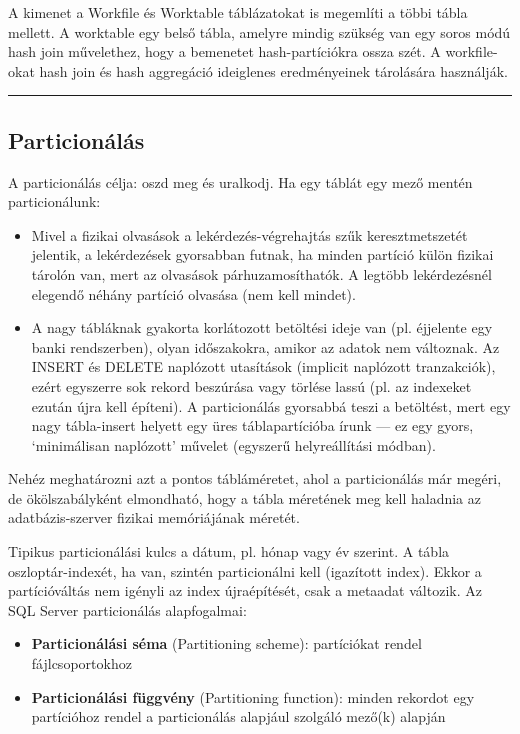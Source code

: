\documentclass[
  magyar,
]{article}
\providecommand{\tightlist}{%
  \setlength{\itemsep}{0pt}\setlength{\parskip}{0pt}}
\begin{document}
A kimenet a Workfile és Worktable táblázatokat is megemlíti a többi
tábla mellett. A worktable egy belső tábla, amelyre mindig szükség van
egy soros módú hash join művelethez, hogy a bemenetet hash-partíciókra
ossza szét. A workfile-okat hash join és hash aggregáció ideiglenes
eredményeinek tárolására használják.

\begin{center}\rule{0.5\linewidth}{0.5pt}\end{center}

\subsection{Particionálás}\label{particionuxe1luxe1s}

A particionálás célja: oszd meg és uralkodj. Ha egy táblát egy mező
mentén particionálunk:

\begin{itemize}
\tightlist
\item
  Mivel a fizikai olvasások a lekérdezés-végrehajtás szűk
  keresztmetszetét jelentik, a lekérdezések gyorsabban futnak, ha minden
  partíció külön fizikai tárolón van, mert az olvasások
  párhuzamosíthatók. A legtöbb lekérdezésnél elegendő néhány partíció
  olvasása (nem kell mindet).
\item
  A nagy tábláknak gyakorta korlátozott betöltési ideje van (pl.
  éjjelente egy banki rendszerben), olyan időszakokra, amikor az adatok
  nem változnak. Az INSERT és DELETE naplózott utasítások (implicit
  naplózott tranzakciók), ezért egyszerre sok rekord beszúrása vagy
  törlése lassú (pl. az indexeket ezután újra kell építeni). A
  particionálás gyorsabbá teszi a betöltést, mert egy nagy tábla-insert
  helyett egy üres táblapartícióba írunk --- ez egy gyors, `minimálisan
  naplózott' művelet (egyszerű helyreállítási módban).
\end{itemize}

Nehéz meghatározni azt a pontos tábláméretet, ahol a particionálás már
megéri, de ökölszabályként elmondható, hogy a tábla méretének meg kell
haladnia az adatbázis-szerver fizikai memóriájának méretét.

Tipikus particionálási kulcs a dátum, pl. hónap vagy év szerint. A tábla
oszloptár-indexét, ha van, szintén particionálni kell (igazított index).
Ekkor a partícióváltás nem igényli az index újraépítését, csak a
metaadat változik. Az SQL Server particionálás alapfogalmai:

\begin{itemize}
\tightlist
\item
  \textbf{Particionálási séma} (Partitioning scheme): partíciókat rendel
  fájlcsoportokhoz
\item
  \textbf{Particionálási függvény} (Partitioning function): minden
  rekordot egy partícióhoz rendel a particionálás alapjául szolgáló
  mező(k) alapján
\end{itemize}
\end{document}
